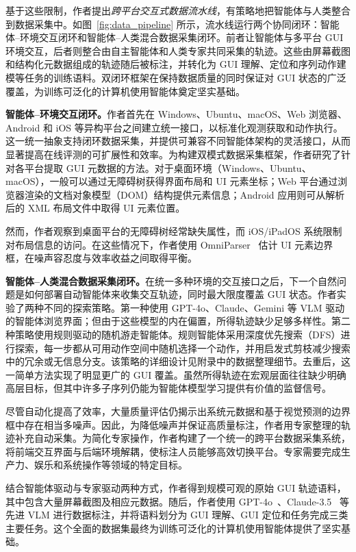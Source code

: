 \documentclass[10pt,twocolumn]{article}
\begin{document}
基于这些限制，作者提出\emph{跨平台交互式数据流水线}，有策略地把智能体与人类整合到数据采集中。如图~\ref{fig:data_pipeline} 所示，流水线运行两个协同闭环：智能体--环境交互闭环和智能体--人类混合数据采集闭环。前者让智能体与多平台 GUI 环境交互，后者则整合由自主智能体和人类专家共同采集的轨迹。这些由屏幕截图和结构化元数据组成的轨迹随后被标注，并转化为 GUI 理解、定位和序列动作建模等任务的训练语料。双闭环框架在保持数据质量的同时保证对 GUI 状态的广泛覆盖，为训练可泛化的计算机使用智能体奠定坚实基础。

\textbf{智能体--环境交互闭环。}作者首先在 Windows、Ubuntu、macOS、Web 浏览器、Android 和 iOS 等异构平台之间建立统一接口，以标准化观测获取和动作执行。这一统一抽象支持闭环数据采集，并提供可兼容不同智能体架构的灵活接口，从而显著提高在线评测的可扩展性和效率。为构建双模式数据采集框架，作者研究了针对各平台提取 GUI 元数据的方法。对于桌面环境（Windows、Ubuntu、macOS），一般可以通过无障碍树获得界面布局和 UI 元素坐标；Web 平台通过浏览器渲染的文档对象模型（DOM）结构提供元素信息；Android 应用则可从解析后的 XML 布局文件中取得 UI 元素位置。

然而，作者观察到桌面平台的无障碍树经常缺失属性，而 iOS/iPadOS 系统限制对布局信息的访问。在这些情况下，作者使用 OmniParser~\citep{yu2025omniparser} 估计 UI 元素边界框，在噪声容忍度与效率收益之间取得平衡。

\textbf{智能体--人类混合数据采集闭环。}在统一多种环境的交互接口之后，下一个自然问题是如何部署自动智能体来收集交互轨迹，同时最大限度覆盖 GUI 状态。作者实验了两种不同的探索策略。第一种使用 GPT-4o、Claude、Gemini 等 VLM 驱动的智能体浏览界面；但由于这些模型的内在偏置，所得轨迹缺少足够多样性。第二种策略使用规则驱动的随机游走智能体。规则智能体采用深度优先搜索（DFS）进行探索，每一步都从可用动作空间中随机选择一个动作，并用启发式剪枝减少搜索中的冗余或无信息分支。该策略的详细设计见附录中的数据整理细节。去重后，这一简单方法实现了明显更广的 GUI 覆盖。虽然所得轨迹在宏观层面往往缺少明确高层目标，但其中许多子序列仍能为智能体模型学习提供有价值的监督信号。

尽管自动化提高了效率，大量质量评估仍揭示出系统元数据和基于视觉预测的边界框中存在相当多噪声。因此，为降低噪声并保证高质量标注，作者用专家整理的轨迹补充自动采集。为简化专家操作，作者构建了一个统一的跨平台数据采集系统，将前端交互界面与后端环境解耦，使标注人员能够高效切换平台。专家需要完成生产力、娱乐和系统操作等领域的特定目标。

结合智能体驱动与专家驱动两种方式，作者得到规模可观的原始 GUI 轨迹语料，其中包含大量屏幕截图及相应元数据。随后，作者使用 GPT-4o~\citep{hurst2024gpt}、Claude-3.5~\citep{anthropic2024claude35} 等先进 VLM 进行数据标注，并将语料划分为 GUI 理解、GUI 定位和任务完成三类主要任务。这个全面的数据集最终为训练可泛化的计算机使用智能体提供了坚实基础。
\end{document}
